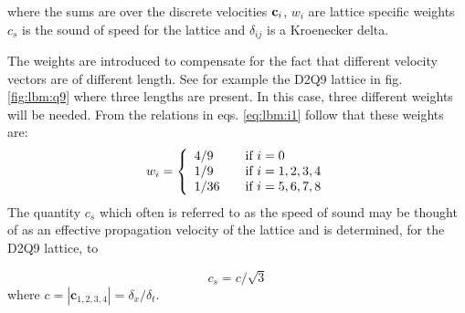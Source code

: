 
where the sums are over the discrete velocities $\mathbf{c}_i$, $w_i$ are
lattice specific weights $c_s$ is the sound of speed for the lattice
and $\delta_{ij}$ is a Kroenecker delta. 

The weights are introduced to compensate for the fact that different
velocity vectors are of different length. See for example the
D2Q9 lattice in fig. \ref{fig:lbm:q9} where three lengths are
present. In this case, three different weights will be needed. From
the relations in eqs. \eqref{eq:lbm:i1} follow that
these weights are: 
\begin{equation}\label{eq:lbm:weights}
w_i = 
\left\{
  \begin{array}{l l}
    4/9 & \quad \text{if $i = 0$}\\ 
    1/9 & \quad \text{if $i = 1, 2, 3, 4$}\\    
    1/36 & \quad \text{if $i = 5, 6, 7, 8$}\\
  \end{array} \right.
\end{equation}
The quantity $c_s$ which often is referred to as the speed of sound
may be thought of as an effective propagation velocity of the lattice
and is determined, for the D2Q9 lattice, to

\begin{equation}
c_s = c/\sqrt{3}
\end{equation} 
where $c = |\mathbf{c}_{1,2,3,4}| = \delta_x/\delta_t$.

